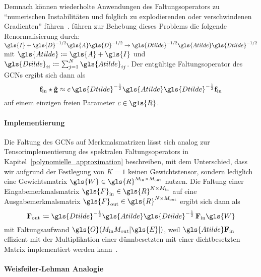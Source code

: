 Demnach können wiederholte Anwendungen des Faltungsoperators zu \enquote{numerischen Instabilitäten und folglich zu explodierenden oder verschwindenen Gradienten} führen~\cite{gcn}.
\citeauthor{gcn} führen zur Behebung dieses Problems die folgende Renormalisierung durch: $\gls{I} + \gls{D}^{-1/2} \gls{A} \gls{D}^{-1/2} \rightarrow \gls{Dtilde}^{-1/2} \gls{Atilde} \gls{Dtilde}^{-1/2}$ mit $\gls{Atilde} \coloneqq \gls{A} + \gls{I}$ und $\gls{Dtilde}_{ii} \coloneqq \sum_{j=1}^N \gls{Atilde}_{ij}$.
Der entgültige Faltungsoperator des \glspl{GCN} ergibt sich dann als
\begin{equation*}
  \ve{f}_{\mathrm{in}} \star \ve{\hat g} \approx c\, \gls{Dtilde}^{-\frac{1}{2}} \gls{Atilde} \gls{Dtilde}^{-\frac{1}{2}} \ve{f}_{\mathrm{in}}
\end{equation*}
auf einem einzigen freien Parameter $c \in \gls{R}$.

\paragraph{Implementierung}
\label{gcn_tensor}

Die Faltung des \glspl{GCN} auf Merkmalsmatrizen lässt sich analog zur Tensorimplementierung des spektralen Faltungsoperators in Kapitel~\ref{polynomielle_approximation} beschreiben, mit dem Unterschied, dass wir aufgrund der Festlegung von $K=1$ keinen Gewichtstensor, sondern lediglich eine Gewichtsmatrix $\gls{W} \in \gls{R}^{M_{\mathrm{in}} \times M_{\mathrm{out}}}$ nutzen.
Die Faltung einer Eingabemerkmalsmatrix $\gls{F}_{\mathrm{in}} \in \gls{R}^{N \times M_{\mathrm{in}}}$ auf eine Ausgabemerkmalsmatrix $\gls{F}_{\mathrm{out}} \in \gls{R}^{N \times M_{\mathrm{out}}}$ ergibt sich dann als
\begin{equation*}
  \ma{F}_{\mathrm{out}} \coloneqq \gls{Dtilde}^{-\frac{1}{2}} \gls{Atilde} \gls{Dtilde}^{-\frac{1}{2}}\, \ma{F}_{\mathrm{in}} \gls{W}
\end{equation*}
mit Faltungsaufwand $\gls{O}\left(M_{\mathrm{in}}M_{\mathrm{out}}\left|\gls{E}\right|\right)$, weil $\gls{Atilde}\ma{F}_{\mathrm{in}}$ effizient mit der Multiplikation einer dünnbesetzten mit einer dichtbesetzten Matrix implementiert werden kann~\cite{gcn}.

\paragraph{Weisfeiler-Lehman Analogie}
\label{weisfeiler_lehman_analogie}

